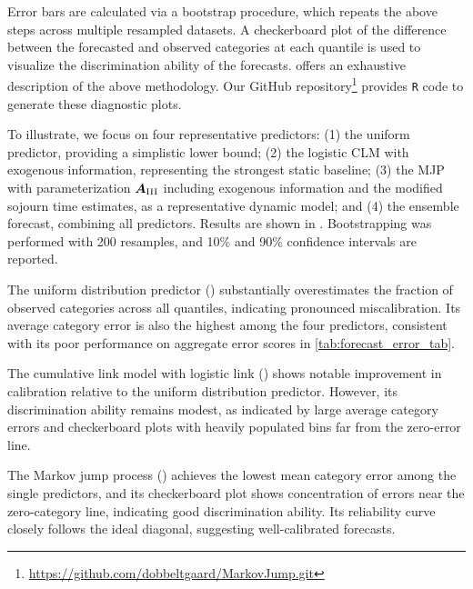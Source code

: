 Error bars are calculated via a bootstrap procedure, which repeats the above steps across multiple resampled datasets. A checkerboard plot of the difference between the forecasted and observed categories at each quantile is used to visualize the discrimination ability of the forecasts. \citet{hamill1997} offers an exhaustive description of the above methodology. Our GitHub repository\footnote{\url{https://github.com/dobbeltgaard/MarkovJump.git}} provides \texttt{R} code to generate these diagnostic plots.
 

To illustrate, we focus on four representative predictors: 
(1) the uniform predictor, providing a simplistic lower bound; 
(2) the logistic CLM with exogenous information, representing the strongest static baseline; 
(3) the MJP with parameterization $\bm{A}_{\RN{3}}$ including exogenous information and the modified sojourn time estimates, as a representative dynamic model; and 
(4) the ensemble forecast, combining all predictors. 
Results are shown in . Bootstrapping was performed with 200 resamples, and 10\% and 90\% confidence intervals are reported.



The uniform distribution predictor () substantially overestimates the fraction of observed categories across all quantiles, indicating pronounced miscalibration.
Its average category error is also the highest among the four predictors, consistent with its poor performance on aggregate error scores in \cref{tab:forecast_error_tab}.

The cumulative link model with logistic link () shows notable improvement in calibration relative to the uniform distribution predictor.
However, its discrimination ability remains modest, as indicated by large average category errors and checkerboard plots with heavily populated bins far from the zero-error line.

The Markov jump process () achieves the lowest mean category error among the single predictors, and its checkerboard plot shows concentration of errors near the zero-category line, indicating good discrimination ability.
Its reliability curve closely follows the ideal diagonal, suggesting well-calibrated forecasts.

